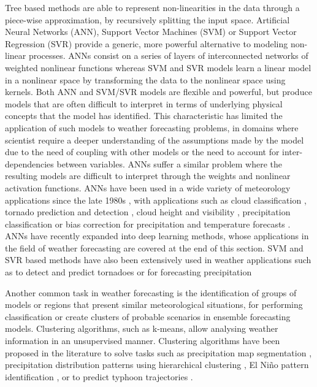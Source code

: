 Tree based methods are able to represent non-linearities in the data through a piece-wise approximation, by recursively splitting the input space. Artificial Neural Networks (ANN), Support Vector Machines (SVM) or Support Vector Regression (SVR) provide a generic, more powerful alternative to modeling non-linear processes. ANNs consist on a series of layers of interconnected networks of weighted nonlinear functions whereas SVM and SVR models learn a linear model in a nonlinear space by transforming the data to the nonlinear space using kernels. Both ANN and SVM/SVR models are flexible and powerful, but produce models that are often difficult to interpret in terms of underlying physical concepts that the model has identified. This characteristic has limited the application of such models to weather forecasting problems, in domains where scientist require a deeper understanding of the assumptions made by the model due to the need of coupling with other models or the need to account for inter-dependencies between variables. ANNs suffer a similar problem where the resulting models are difficult to interpret through the weights and nonlinear activation functions. ANNs have been used in a wide variety of meteorology applications since the late 1980s \citep{key1989classification}, with applications such as cloud classification \citep{bankert1994cloud}, tornado prediction and detection \citep{marzban2006mos}, cloud height and visibility \citep{marzban2007ceiling}, precipitation classification \citep{anagnostou2004convective} or bias correction for precipitation and temperature forecasts \citep{moghim2017bias}. ANNs have recently expanded into deep learning methods, whose applications in the field of weather forecasting are covered at the end of this section. SVM and SVR based methods have also been extensively used in weather applications such as to detect and predict tornadoes \citep{adrianto2009support} or for forecasting precipitation \citep{wei2012wavelet,liu2015wavelet} 

\medskip

Another common task in weather forecasting is the identification of groups of models or regions that present similar meteorological situations, for performing classification or create clusters of probable scenarios in ensemble forecasting models. Clustering algorithms, such as k-means, allow analysing weather information in an unsupervised manner. Clustering algorithms have been proposed in the literature to solve tasks such as precipitation map segmentation \citep{baldwin2005automated}, precipitation distribution patterns using hierarchical clustering \citep{ramos2001hierarchical}, El Ni\~{n}o pattern identification  \citep{johnson2013enso}, or to predict typhoon trajectories \citep{camargo2007cluster}.

